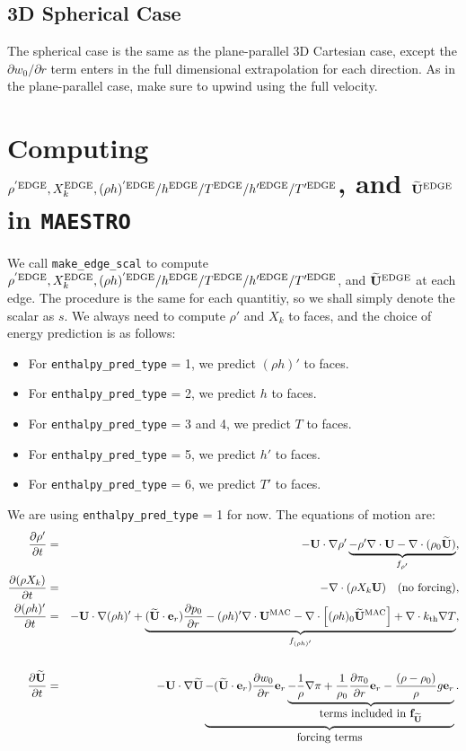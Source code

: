\newpage

\subsection{3D Spherical Case}
The spherical case is the same as the plane-parallel 3D Cartesian 
case, except the $\partial w_0/\partial r$ term enters 
in the full dimensional extrapolation for each direction.
As in the plane-parallel case, make sure to upwind using the 
full velocity.

\newpage

\section{Computing $\rho^{'\rm EDGE}, X_k^{\rm EDGE},(\rho h)^{'\rm EDGE} / h^{\rm EDGE} / T^{\rm EDGE} / h'^{\rm EDGE} / T'^{\rm EDGE}$, and $\widetilde{{\bf U}}^{\rm EDGE}$ in {\tt MAESTRO}}\label{Scalar Edge State Prediction in MAESTRO}
We call {\tt make\_edge\_scal} to compute $\rho^{'\rm EDGE}, X_k^{\rm EDGE}, 
(\rho h)^{'\rm EDGE} / h^{\rm EDGE} / T^{\rm EDGE} / h'^{\rm EDGE} / T'^{\rm EDGE}$, 
and $\widetilde{{\bf U}}^{\rm EDGE}$ at each edge.
The procedure is the same for each quantitiy, so we shall simply denote 
the scalar as $s$.  We always need to compute $\rho'$ and $X_k$ to faces, 
and the choice of energy prediction is as follows:
\begin{itemize}
\item For {\tt enthalpy\_pred\_type} = 1, we predict $(\rho h)'$ to faces.
\item For {\tt enthalpy\_pred\_type} = 2, we predict $h$ to faces.
\item For {\tt enthalpy\_pred\_type} = 3 and 4, we predict $T$ to faces.
\item For {\tt enthalpy\_pred\_type} = 5, we predict $h'$ to faces.
\item For {\tt enthalpy\_pred\_type} = 6, we predict $T'$ to faces.
\end{itemize}
We are using {\tt enthalpy\_pred\_type} = 1 for now.  The equations
of motion are:
\begin{eqnarray}
\frac{\partial \rho'}{\partial t} &=& -{\bf U}\cdot\nabla\rho' \underbrace{- \rho'\nabla\cdot{\bf U} - \nabla\cdot(\rho_0\widetilde{{\bf U}})}_{f_{\rho'}}, \\
\frac{\partial(\rho X_k)}{\partial t} &=& -\nabla\cdot(\rho X_k{\bf U}) ~~~ \text{(no forcing)}, \\
\frac{\partial(\rho h)'}{\partial t} &=& -{\bf U}\cdot\nabla(\rho h)' + \underbrace{(\widetilde{{\bf U}}\cdot{\bf e}_r)\frac{\partial p_0}{\partial r} -(\rho h)'\nabla\cdot{\bf U}^{\rm MAC} - \nabla\cdot\left[(\rho h)_0\widetilde{{\bf U}}^{\rm MAC}\right] + \nabla\cdot k_{\rm th}\nabla T}_{f_{(\rho h)'}}, \nonumber \\
&& \\
\frac{\partial\widetilde{{\bf U}}}{\partial t} &=& -{\bf U}\cdot\nabla\widetilde{{\bf U}} \underbrace{- (\widetilde{{\bf U}}\cdot{\bf e}_r)\frac{\partial w_0}{\partial r}{\bf e}_r \underbrace{- \frac{1}{\rho}\nabla\pi + \frac{1}{\rho_0}\frac{\partial\pi_0}{\partial r}{\bf e}_r - \frac{(\rho-\rho_0)}{\rho}g{\bf e}_r}_{\hbox{terms included in ${\bf f}_{\widetilde{{\bf U}}}$}}}_{\hbox{forcing terms}}.
\end{eqnarray}

